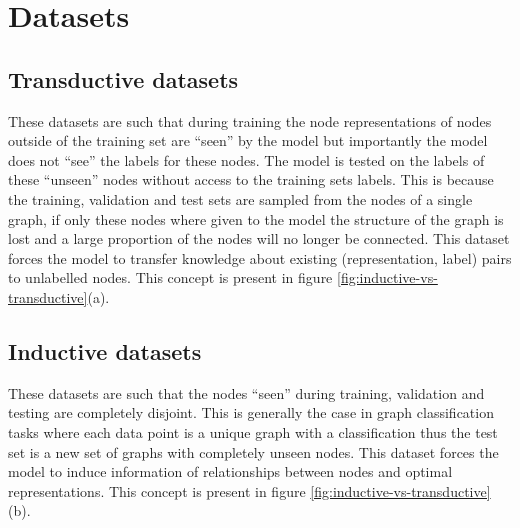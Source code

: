 \chapter{Datasets}
\label{app:datasets}


\section{Transductive datasets}
These datasets are such that during training the node representations of nodes outside of the training set are ``seen'' by the model but importantly the model does not ``see'' the labels for these nodes.
The model is tested on the labels of these ``unseen'' nodes without access to the training sets labels.
This is because the training, validation and test sets are sampled from the nodes of a single graph, if only these nodes where given to the model the structure of the graph is lost and a large proportion of the nodes will no longer be connected.
This dataset forces the model to transfer knowledge about existing (representation, label) pairs to unlabelled nodes.
This concept is present in figure \ref{fig:inductive-vs-transductive}(a).

\section{Inductive datasets}
These datasets are such that the nodes ``seen'' during training, validation and testing are completely disjoint.
This is generally the case in graph classification tasks where each data point is a unique graph with a classification thus the test set is a new set of graphs with completely unseen nodes.
This dataset forces the model to induce information of relationships between nodes and optimal representations.
This concept is present in figure \ref{fig:inductive-vs-transductive}(b).

